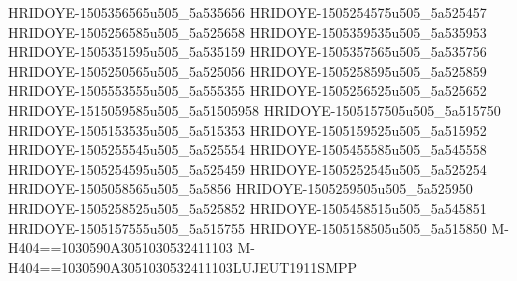 HRIDOYE-1505356565u505_5a535656
HRIDOYE-1505254575u505_5a525457
HRIDOYE-1505256585u505_5a525658
HRIDOYE-1505359535u505_5a535953
HRIDOYE-1505351595u505_5a535159
HRIDOYE-1505357565u505_5a535756
HRIDOYE-1505250565u505_5a525056
HRIDOYE-1505258595u505_5a525859
HRIDOYE-1505553555u505_5a555355
HRIDOYE-1505256525u505_5a525652
HRIDOYE-1515059585u505_5a51505958
HRIDOYE-1505157505u505_5a515750
HRIDOYE-1505153535u505_5a515353
HRIDOYE-1505159525u505_5a515952
HRIDOYE-1505255545u505_5a525554
HRIDOYE-1505455585u505_5a545558
HRIDOYE-1505254595u505_5a525459
HRIDOYE-1505252545u505_5a525254
HRIDOYE-1505058565u505_5a5856
HRIDOYE-1505259505u505_5a525950
HRIDOYE-1505258525u505_5a525852
HRIDOYE-1505458515u505_5a545851
HRIDOYE-1505157555u505_5a515755
HRIDOYE-1505158505u505_5a515850
M-H404==1030590A3051030532411103
M-H404==1030590A3051030532411103LUJEUT1911SMPP
